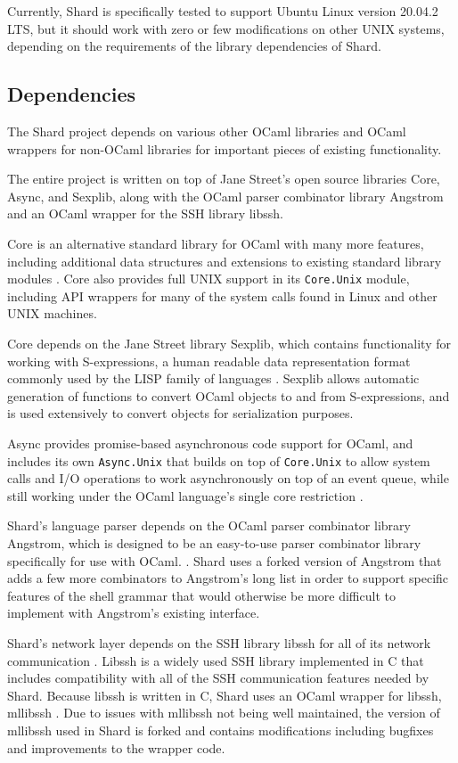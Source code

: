 \documentclass[twoside]{report}
\begin{document}
Currently, Shard is specifically tested to support Ubuntu Linux version 20.04.2 LTS, but it should work with zero or few modifications on other UNIX systems, depending on the requirements of the library dependencies of Shard.

\subsection{Dependencies}
The Shard project depends on various other OCaml libraries and OCaml wrappers for non-OCaml libraries for important pieces of existing functionality.

The entire project is written on top of Jane Street's open source libraries Core, Async, and Sexplib, along with the OCaml parser combinator library Angstrom and an OCaml wrapper for the SSH library libssh.

Core is an alternative standard library for OCaml with many more features, including additional data structures and extensions to existing standard library modules \cite{ocamlcore}.
Core also provides full UNIX support in its \texttt{Core.Unix} module, including API wrappers for many of the system calls found in Linux and other UNIX machines.

Core depends on the Jane Street library Sexplib, which contains functionality for working with S-expressions, a human readable data representation format commonly used by the LISP family of languages \cite{mccarthy1960recursive}. Sexplib allows automatic generation of functions to convert OCaml objects to and from S-expressions, and is used extensively to convert objects for serialization purposes.

Async provides promise-based asynchronous code support for OCaml, and includes its own \texttt{Async.Unix} that builds on top of \texttt{Core.Unix} to allow system calls and I/O operations to work asynchronously on top of an event queue, while still working under the OCaml language's single core restriction \cite{ocamlasync}.

Shard's language parser depends on the OCaml parser combinator library Angstrom, which is designed to be an easy-to-use parser combinator library specifically for use with OCaml. \cite{ocamlangstrom}.
Shard uses a forked version of Angstrom that adds a few more combinators to Angstrom's long list in order to support specific features of the shell grammar that would otherwise be more difficult to implement with Angstrom's existing interface.

Shard's network layer depends on the SSH library libssh for all of its network communication \cite{libssh}.
Libssh is a widely used SSH library implemented in C that includes compatibility with all of the SSH communication features needed by Shard.
Because libssh is written in C, Shard uses an OCaml wrapper for libssh, mllibssh \cite{mllibssh}.
Due to issues with mllibssh not being well maintained, the version of mllibssh used in Shard is forked and contains modifications including bugfixes and improvements to the wrapper code.
\end{document}
